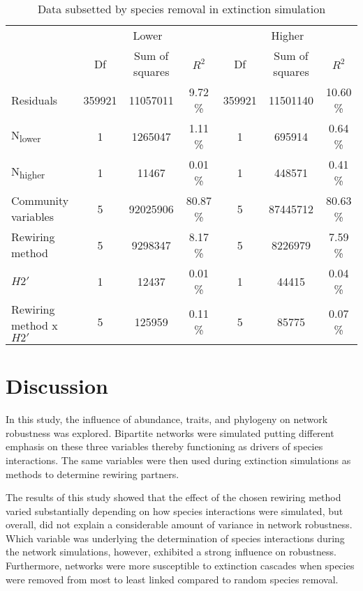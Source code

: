 \documentclass[12pt,a4paper]{article}
\begin{document}
\begin{table}[H]
\begin{subtable}{\linewidth}
\caption{Data subsetted by species removal in extinction simulation}
\label{tab:anova_lo_hi_deg}
\begin{tabularx}{\linewidth}{@{} X *6{c} @{}}
\toprule
  & \multicolumn{3}{c}{Lower} & \multicolumn{3}{c}{Higher} \\ \cmidrule(l){2-4} \cmidrule(l){5-7} 
  						& Df 	& Sum of squares	& $R^2$ 		& Df 	& Sum of squares 	& $R^2$  \\ \midrule
Residuals 				& 359921 & 11057011  		& 9.72 \% 	& 359921	& 11501140 			& 10.60 \%\\ 
N\textsubscript{lower} 	& 1 		& 1265047 		& 1.11 \% 	& 1 		& 695914 			& 0.64 \%\\
N\textsubscript{higher} 	& 1 		& 11467 			& 0.01 \% 	& 1 		& 448571 			& 0.41 \%\\
Community variables 		& 5 		& 92025906 		& 80.87 \% 	& 5 		& 87445712 			& 80.63 \%\\
Rewiring method 			& 5 		& 9298347		& 8.17 \% 	& 5 		& 8226979				& 7.59 \%\\ 
$H2'$ 					& 1 		& 12437 			& 0.01 \% 	& 1 		& 44415 				& 0.04 \%\\
Rewiring method x $H2'$ 	& 5 		& 125959 			& 0.11 \% 	& 5 		& 85775				& 0.07 \%\\ \bottomrule
\end{tabularx}
\end{subtable}
\medskip
\end{table}

	\section{Discussion}

In this study, the influence of abundance, traits, and phylogeny on network robustness was explored. Bipartite networks were simulated putting different emphasis on these three variables thereby functioning as drivers of species interactions. The same variables were then used during extinction simulations as methods to determine rewiring partners.\par
The results of this study showed that the effect of the chosen rewiring method varied substantially depending on how species interactions were simulated, but overall, did not explain a considerable amount of variance in network robustness. Which variable was underlying the determination of species interactions during the network simulations, however, exhibited a strong influence on robustness. Furthermore, networks were more susceptible to extinction cascades when species were removed from most to least linked compared to random species removal.\paragraph{}
\end{document}
